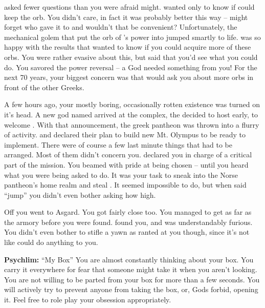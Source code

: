 \documentclass[char]{guardians}
\begin{document}
\cHephaestus{} asked fewer questions than you were afraid \cHephaestus{} might. \cHephaestus{} wanted only to know if \cHephaestus{\they} could keep the orb. You didn't care, in fact it was probably better this way -- \cHephaestus{} might forget who gave it to \cHephaestus{} and wouldn't that be convenient? Unfortunately, the mechanical golem that \cHephaestus{} put the orb of \cOsiris{}'s power into jumped smartly to life. \cHephaestus{} was so happy with the results that \cHephaestus{\they} wanted to know if you could acquire more of these orbs. You were rather evasive about this, but said that you'd see what you could do. You savored the power reversal -- a God needed something from you! For the next 70 years, your biggest concern was that \cHephaestus{} would ask you about more orbs in front of the other Greeks.

A few hours ago, your mostly boring, occasionally rotten existence was turned on it's head. A new god named \cUnity{} arrived at the complex, the \cCaretaker{} decided to host \pGames{} early, to welcome \cUnity{\them}. With that announcement, the greek pantheon was thrown into a flurry of activity. \cZeus{} and \cHephaestus{} declared their plan to build new Mt. Olympus to be ready to implement. There were of course a few last minute things that had to be arranged. Most of them didn't concern you. \cZeus{} declared you in charge of a critical part of the mission. You beamed with pride at being chosen -- until you heard what you were being asked to do. It was your task to sneak into the Norse pantheon's home realm and steal \iHammer{}. It seemed impossible to do, but when \cZeus{} said ``jump'' you didn't even bother asking how high.

Off you went to Asgard. You got fairly close too. You managed to get as far as the armory before you were found. \cHel{} found you, and \cHel{\they} was understandably furious. You didn't even bother to stifle a yawn as \cHel{\they} ranted at you though, since it's not like \cHel{\they} could do anything to you.

\begin{itemz}[Notes]
  \item\textbf{Psychlim:} ``My Box'' You are almost constantly thinking about your box. You carry it everywhere for fear that someone might take it when you aren't looking. You are not willing to be parted from your box for more than a few seconds. You will actively try to prevent anyone from taking the box, or, Gods forbid, opening it. Feel free to role play your obsession appropriately.
\end{itemz}
\end{document}
